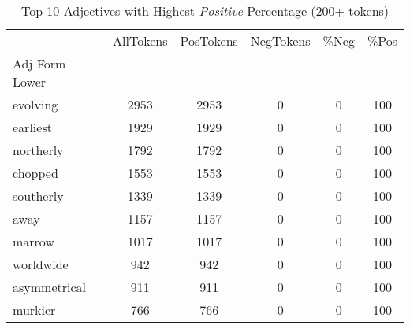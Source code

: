 

\singlespacing
\scriptsize\noindent
\begin{table}
\centering
\caption{Top 10 Adjectives with Highest \textit{Positive} Percentage (200+ tokens)}
\label{tab:top10-adj-PosPercent}
\begin{tabular}{*{1}{l}S[table-auto-round, table-format=7.2, drop-zero-decimal]
    S[table-auto-round, table-format=7.2, drop-zero-decimal]
    S[table-auto-round, table-format=7.2, drop-zero-decimal]
    S[table-auto-round, table-format=7.2, drop-zero-decimal]
    S[table-auto-round, table-format=7.2, drop-zero-decimal]}
\toprule
{} & {AllTokens} & {PosTokens} & {NegTokens} & {\%Neg} & {\%Pos} \\
{Adj Form Lower} & {} & {} & {} & {} & {} \\
\midrule
evolving & 2953 & 2953 & 0 & 0 & 100 \\
earliest & 1929 & 1929 & 0 & 0 & 100 \\
northerly & 1792 & 1792 & 0 & 0 & 100 \\
chopped & 1553 & 1553 & 0 & 0 & 100 \\
southerly & 1339 & 1339 & 0 & 0 & 100 \\
away & 1157 & 1157 & 0 & 0 & 100 \\
marrow & 1017 & 1017 & 0 & 0 & 100 \\
worldwide & 942 & 942 & 0 & 0 & 100 \\
asymmetrical & 911 & 911 & 0 & 0 & 100 \\
murkier & 766 & 766 & 0 & 0 & 100 \\
\bottomrule
\end{tabular}
\end{table}

\normalsize
\normalspacing